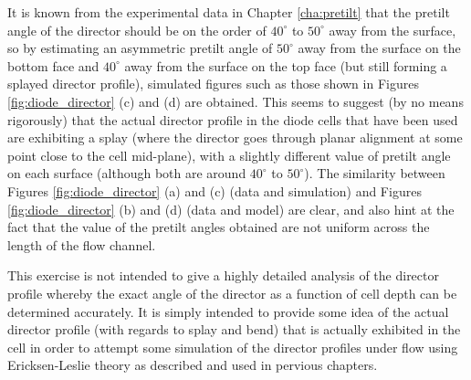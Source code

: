 It is known from the experimental data in Chapter \ref{cha:pretilt} that the pretilt angle of the director should be on the order of $40^{\circ}$ to $50^{\circ}$ away from the surface, so by estimating an asymmetric pretilt angle of $50^{\circ}$ away from the surface on the bottom face and $40^{\circ}$ away from the surface on the top face (but still forming a splayed director profile), simulated figures such as those shown in Figures \ref{fig:diode_director} (c) and (d) are obtained. This seems to suggest (by no means rigorously) that the actual director profile in the diode cells that have been used are exhibiting a splay (where the director goes through planar alignment at some point close to the cell mid-plane), with a slightly different value of pretilt angle on each surface (although both are around $40^{\circ}$ to $50^{\circ}$). The similarity between Figures \ref{fig:diode_director} (a) and (c) (data and simulation) and Figures \ref{fig:diode_director} (b) and (d) (data and model) are clear, and also hint at the fact that the value of the pretilt angles obtained are not uniform across the length of the flow channel.

This exercise is not intended to give a highly detailed analysis of the director profile whereby the exact angle of the director as a function of cell depth can be determined accurately. It is simply intended to provide some idea of the actual director profile (with regards to splay and bend) that is actually exhibited in the cell in order to attempt some simulation of the director profiles under flow using Ericksen-Leslie theory as described and used in pervious chapters.

